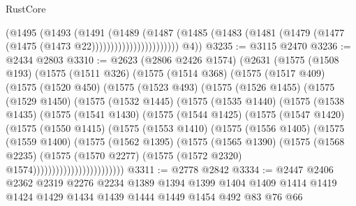 \begin{lexlean}{RustCore}
\begin{coremodule}
                              (@1495
                                (@1493
                                  (@1491
                                    (@1489
                                      (@1487
                                        (@1485
                                          (@1483
                                            (@1481
                                              (@1479 (@1477 (@1475 (@1473 @22)))))))))))))))))))))))
        @4))
@3235 := @3115 @2470
@3236 := @2434 @2803
@3310 := @2623
    (@2806 @2426 @1574)
    (@2631
      (@1575
        (@1508 @193)
        (@1575
          (@1511 @326)
          (@1575
            (@1514 @368)
            (@1575
              (@1517 @409)
              (@1575
                (@1520 @450)
                (@1575
                  (@1523 @493)
                  (@1575
                    (@1526 @1455)
                    (@1575
                      (@1529 @1450)
                      (@1575
                        (@1532 @1445)
                        (@1575
                          (@1535 @1440)
                          (@1575
                            (@1538 @1435)
                            (@1575
                              (@1541 @1430)
                              (@1575
                                (@1544 @1425)
                                (@1575
                                  (@1547 @1420)
                                  (@1575
                                    (@1550 @1415)
                                    (@1575
                                      (@1553 @1410)
                                      (@1575
                                        (@1556 @1405)
                                        (@1575
                                          (@1559 @1400)
                                          (@1575
                                            (@1562 @1395)
                                            (@1575
                                              (@1565 @1390)
                                              (@1575
                                                (@1568 @2235)
                                                (@1575
                                                  (@1570 @2277)
                                                  (@1575 (@1572 @2320) @1574))))))))))))))))))))))))
@3311 := @2778 @2842
@3334 := @2447
    @2406
    @2362
    @2319
    @2276
    @2234
    @1389
    @1394
    @1399
    @1404
    @1409
    @1414
    @1419
    @1424
    @1429
    @1434
    @1439
    @1444
    @1449
    @1454
    @492
    @83
    @76
    @66

\end{coremodule}
\end{lexlean}
